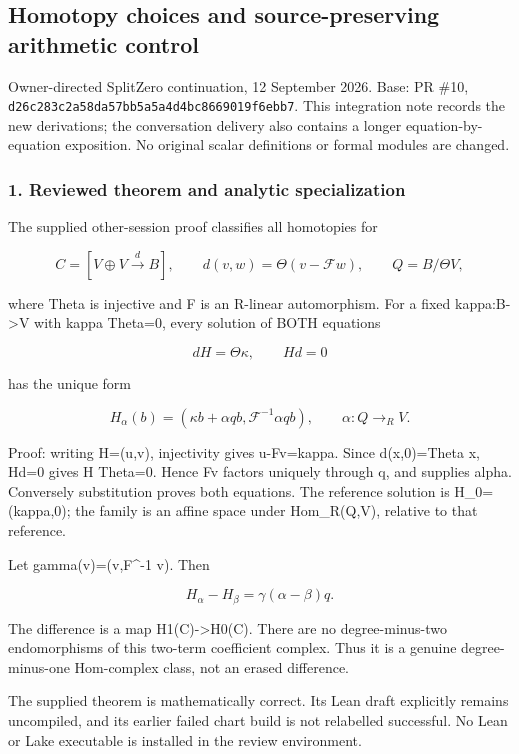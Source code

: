 \subsection{Homotopy choices and source-preserving arithmetic
control}\label{pr_11:homotopy-choices-and-source-preserving-arithmetic-control}

Owner-directed SplitZero continuation, 12 September 2026. Base: PR \#10,
\nolinkurl{d26c283c2a58da57bb5a5a4d4bc8669019f6ebb7}. This integration note records the new derivations; the
conversation delivery also contains a longer equation-by-equation exposition. No original scalar
definitions or formal modules are changed.

\subsubsection{1. Reviewed theorem and analytic
specialization}\label{pr_11:reviewed-theorem-and-analytic-specialization}

The supplied other-session proof classifies all homotopies for

\[C=[V\oplus V\xrightarrow d B],\qquad d(v,w)=\Theta(v-\mathcal Fw),\qquad Q=B/\Theta V,\]

where Theta is injective and F is an R-linear automorphism. For a fixed kappa:B-\textgreater V with
kappa Theta=0, every solution of BOTH equations

\[dH=\Theta\kappa,\qquad Hd=0\]

has the unique form

\[H_\alpha(b)=(\kappa b+\alpha qb,\mathcal F^{-1}\alpha qb),\qquad\alpha:Q\to_R V.\]

Proof: writing H=(u,v), injectivity gives u-Fv=kappa. Since d(x,0)=Theta x, Hd=0 gives H Theta=0.
Hence Fv factors uniquely through q, and supplies alpha. Conversely substitution proves both
equations. The reference solution is H\_0=(kappa,0); the family is an affine space under
Hom\_R(Q,V), relative to that reference.

Let gamma(v)=(v,F\^{}-1 v). Then

\[H_\alpha-H_\beta=\gamma(\alpha-\beta)q.\]

The difference is a map H1(C)-\textgreater H0(C). There are no degree-minus-two endomorphisms of
this two-term coefficient complex. Thus it is a genuine degree-minus-one Hom-complex class, not an
erased difference.

The supplied theorem is mathematically correct. Its Lean draft explicitly remains uncompiled, and
its earlier failed chart build is not relabelled successful. No Lean or Lake executable is installed
in the review environment.


